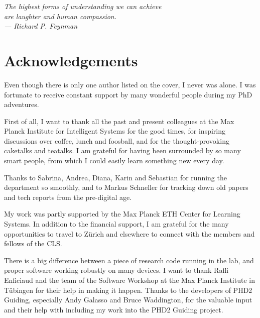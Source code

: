 
\begin{flushright}{\slshape
The highest forms of understanding we can achieve\\
are laughter and human compassion.\\
--- Richard P. Feynman}
\end{flushright}

\begingroup
\let\clearpage\relax
\let\cleardoublepage\relax
\let\cleardoublepage\relax
\setlength{\parskip}{0.5\baselineskip}
\setlength{\parindent}{0pt}
\chapter*{Acknowledgements}

Even though there is only one author listed on the cover, I never was alone. I
was fortunate to receive constant support by many wonderful people during my PhD
adventures.

First of all, I want to thank all the past and present colleagues at the Max
Planck Institute for Intelligent Systems for the good times, for inspiring
discussions over coffee, lunch and foosball, and for the thought-provoking
caketalks and teatalks. I am grateful for having been surrounded by so many
smart people, from which I could easily learn something new every day.

Thanks to Sabrina, Andrea, Diana, Karin and Sebastian for running the
department so smoothly, and to Markus Schneller for tracking down old papers and
tech reports from the pre-digital age.

My work was partly supported by the Max Planck ETH Center for Learning Systems.
In addition to the financial support, I am grateful for the many opportunities
to travel to Z{\"u}rich and elsewhere to connect with the members and fellows
of the CLS.

There is a big difference between a piece of research code running in the lab,
and proper software working robustly on many devices. I want to thank Raffi
Enficiaud and the team of the Software Workshop at the Max Planck Institute in
T{\"u}bingen for their help in making it happen. Thanks to the developers of
PHD2 Guiding, especially Andy Galasso and Bruce Waddington, for the valuable
input and their help with including my work into the PHD2 Guiding project.

